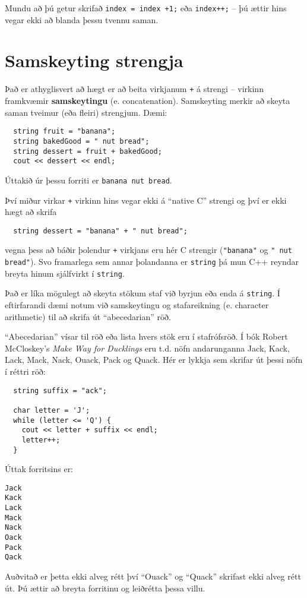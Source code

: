 Mundu að þú getur skrifað {\tt index = index +1;} eða {\tt index++;} -- þú ættir hins vegar ekki að blanda þessu tvennu saman.

\section{Samskeyting strengja}

Það er athyglisvert að hægt er að beita virkjanum {\tt +} á strengi -- virkinn framkvæmir {\bf samskeytingu} (e. concatenation).
Samskeyting merkir að skeyta saman tveimur (eða fleiri) strengjum.
Dæmi:

\begin{verbatim}
  string fruit = "banana";
  string bakedGood = " nut bread";
  string dessert = fruit + bakedGood;
  cout << dessert << endl;
\end{verbatim}
%
Úttakið úr þessu forriti er {\tt banana nut bread}.

Því miður virkar {\tt +} virkinn hins vegar ekki á ``native C'' strengi og því er ekki hægt að skrifa

\begin{verbatim}
  string dessert = "banana" + " nut bread";
\end{verbatim}
%
vegna þess að báðir þolendur {\tt +} virkjans eru hér C strengir (\verb+"banana"+ og \verb+" nut bread"+).
Svo framarlega sem annar þolandanna er {\tt string} þá mun C++ reyndar breyta hinum sjálfvirkt í {\tt string}.

Það er líka mögulegt að skeyta stökum staf við byrjun eða enda á {\tt string}.
Í eftirfarandi dæmi notum við samskeytingu og stafareikning (e. character arithmetic) til að skrifa út ``abecedarian'' röð.

``Abecedarian'' vísar til röð eða lista hvers stök eru í stafrófsröð.
Í bók Robert McCloskey's {\em Make Way for Ducklings} eru t.d. nöfn andarunganna Jack,
Kack, Lack, Mack, Nack, Ouack, Pack og Quack.
Hér er lykkja sem skrifar út þessi nöfn í réttri röð: 

\begin{verbatim}
  string suffix = "ack";

  char letter = 'J';
  while (letter <= 'Q') {
    cout << letter + suffix << endl;
    letter++;
  }
\end{verbatim}
%
Úttak forritsins er:

\begin{verbatim}
Jack
Kack
Lack
Mack
Nack
Oack
Pack
Qack
\end{verbatim}
%
Auðvitað er þetta ekki alveg rétt því ``Ouack'' og ``Quack'' skrifast ekki alveg rétt út.
Þú ættir að breyta forritinu og leiðrétta þessa villu.

